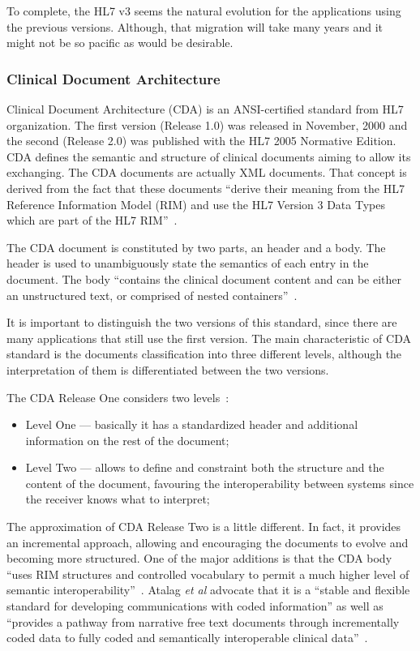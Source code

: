 To complete, the HL7 v3 seems the natural evolution for the applications using the previous versions. Although, that migration will take many years and it might not be so pacific as would be desirable.


\subsubsection{Clinical Document Architecture} \label{sec:hl7-cda}
Clinical Document Architecture (CDA) is an ANSI-certified standard from HL7 organization. The first version (Release 1.0) was released in November, 2000 and the second (Release 2.0) was published with the HL7 2005 Normative Edition.~\citep{Seven} CDA defines the semantic and structure of clinical documents aiming to allow its exchanging. The CDA documents are actually XML documents. That concept is derived from the fact that these documents ``derive their meaning from the HL7 Reference Information Model (RIM) and use the HL7 Version 3 Data Types which are part of the HL7 RIM''~\citep{Atalag2010}.

The CDA document is constituted by two parts, an header and a body. The header is used to unambiguously state the semantics of each entry in the document. The body ``contains the clinical document content and can be either an unstructured text, or comprised of nested containers''~\citep{Eichelberg2005}.

It is important to distinguish the two versions of this standard, since there are many applications that still use the first version. The main characteristic of CDA standard is the documents classification into three different levels, although the interpretation of them is differentiated between the two versions.

The CDA Release One considers two levels~\citep{Seven,Eichelberg2005}:
\begin{itemize}
\item Level One --- basically it has a standardized header and additional information on the rest of the document;
\item Level Two --- allows to define and constraint both the structure and the content of the document, favouring the interoperability between systems since the receiver knows what to interpret;
\end{itemize}

The approximation of CDA Release Two is a little different. In fact, it provides an incremental approach, allowing and encouraging the documents to evolve and becoming more structured. One of the major additions is that the CDA body ``uses RIM structures and controlled vocabulary to permit a much higher level of semantic interoperability''~\citep{Seven}. Atalag \textit{et al} advocate that it is a ``stable and flexible standard for developing communications with coded information'' as well as ``provides a pathway from narrative free text documents through incrementally coded data to fully coded and semantically interoperable clinical data''~\citep{Atalag2010}.



